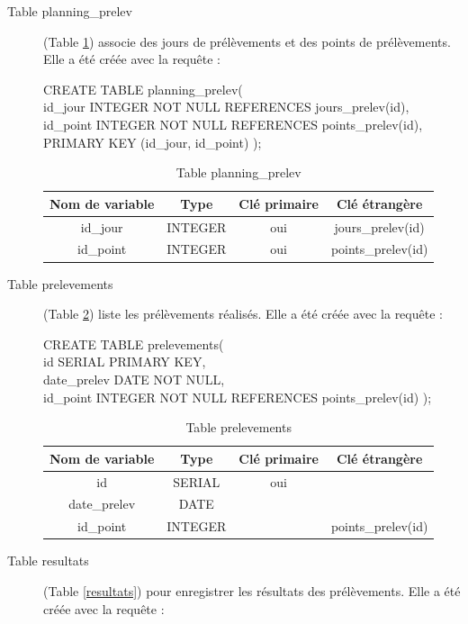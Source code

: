 \documentclass[12pt,a4paper,oneside]{article}
\begin{document}
\begin{description}
\item[Table planning\_prelev] (Table \ref{planning}) associe des jours de prélèvements et des points de prélèvements. Elle a été créée avec la requête :
\begin{tabbing}
CREATE TABLE planning\_prelev(\\
id\_jour INTEGER NOT NULL REFERENCES jours\_prelev(id),\\
id\_point INTEGER NOT NULL REFERENCES points\_prelev(id),\\
PRIMARY KEY (id\_jour, id\_point)
);
\end{tabbing}
\begin{table}
\caption{Table planning\_prelev \label{planning}}
\begin{center}
\begin{tabular}{|c|c|c|c|}
	\hline
	\textbf{Nom de variable} & \textbf{Type} & \textbf{Clé primaire} & \textbf{Clé étrangère}\\
	\hline
	id\_jour & INTEGER & oui & jours\_prelev(id)\\
	id\_point & INTEGER & oui & points\_prelev(id)\\
	\hline
\end{tabular}
\end{center}
\end{table}

\item[Table prelevements] (Table \ref{prelevements}) liste les prélèvements réalisés. Elle a été créée avec la requête :
\begin{tabbing}
CREATE TABLE prelevements(\\
id SERIAL PRIMARY KEY,\\
date\_prelev DATE NOT NULL,\\
id\_point INTEGER NOT NULL REFERENCES points\_prelev(id)
);
\end{tabbing}
\begin{table}
\caption{Table prelevements \label{prelevements}}
\begin{center}
\begin{tabular}{|c|c|c|c|}
	\hline
	\textbf{Nom de variable} & \textbf{Type} & \textbf{Clé primaire} & \textbf{Clé étrangère}\\
	\hline
	id & SERIAL & oui & \\
	date\_prelev & DATE & &\\
	id\_point & INTEGER & & points\_prelev(id)\\
	\hline
\end{tabular}
\end{center}
\end{table}
\newpage
\item[Table resultats] (Table \ref{resultats}) pour enregistrer les résultats des prélèvements. Elle a été créée avec la requête :


\end{description}
\end{document}
